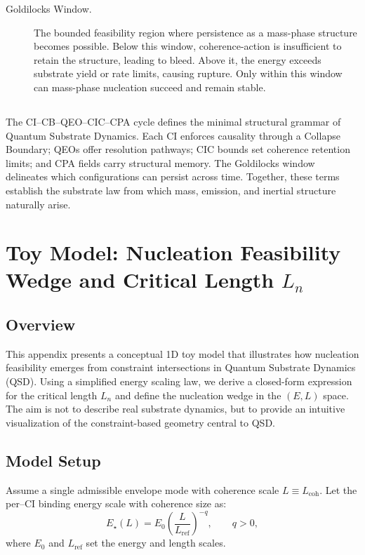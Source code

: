 \documentclass[preprints,article,submit,pdftex,moreauthors]{Definitions/mdpi}
\begin{document}
\begin{description}
  \item[Goldilocks Window.]  
  The bounded feasibility region where persistence as a mass-phase structure becomes possible.  
  Below this window, coherence-action is insufficient to retain the structure, leading to bleed.  
  Above it, the energy exceeds substrate yield or rate limits, causing rupture.  
  Only within this window can mass-phase nucleation succeed and remain stable.

\end{description}

\subsection[\appendixname~\thesubsection]{}
The CI–CB–QEO–CIC–CPA cycle defines the minimal structural grammar of Quantum Substrate Dynamics.  
Each CI enforces causality through a Collapse Boundary; QEOs offer resolution pathways; CIC bounds set coherence retention limits; and CPA fields carry structural memory.  
The Goldilocks window delineates which configurations can persist across time.  
Together, these terms establish the substrate law from which mass, emission, and inertial structure naturally arise.

\section[\appendixname~\thesection]{Toy Model: Nucleation Feasibility Wedge and Critical Length \texorpdfstring{$L_n$}{Ln}}
\label{app:toy}

\subsection[\appendixname~\thesubsection]{Overview}
This appendix presents a conceptual 1D toy model that illustrates how nucleation feasibility emerges from constraint intersections in Quantum Substrate Dynamics (QSD). Using a simplified energy scaling law, we derive a closed-form expression for the critical length \( L_n \) and define the nucleation wedge in the \((E, L)\) space. The aim is not to describe real substrate dynamics, but to provide an intuitive visualization of the constraint-based geometry central to QSD.

\subsection{Model Setup}
Assume a single admissible envelope mode with coherence scale \( L \equiv L_{\mathrm{coh}} \). Let the per–CI binding energy scale with coherence size as:
\begin{equation}
E_\star(L) = E_0 \left(\frac{L}{L_{\mathrm{ref}}}\right)^{-q}, \qquad q > 0,
\label{eq:toy-Estar}
\end{equation}
where \( E_0 \) and \( L_{\mathrm{ref}} \) set the energy and length scales.
\end{document}
